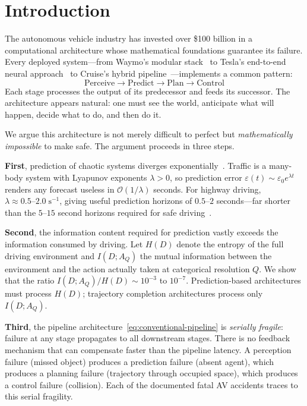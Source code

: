 \documentclass[twocolumn,10pt]{article}
\theoremstyle{definition}
\newcommand{\BigO}{\mathcal{O}}
\begin{document}
\section{Introduction}
\label{sec:introduction}

The autonomous vehicle industry has invested over \$100 billion in a computational architecture whose mathematical foundations guarantee its failure. Every deployed system---from Waymo's modular stack~\cite{urmson2008,levinson2011} to Tesla's end-to-end neural approach~\cite{bojarski2016,chen2024} to Cruise's hybrid pipeline~\cite{bansal2019}---implements a common pattern:
\begin{equation}
\text{Perceive} \to \text{Predict} \to \text{Plan} \to \text{Control}
\label{eq:conventional-pipeline}
\end{equation}
Each stage processes the output of its predecessor and feeds its successor. The architecture appears natural: one must see the world, anticipate what will happen, decide what to do, and then do it.

We argue this architecture is not merely difficult to perfect but \emph{mathematically impossible} to make safe. The argument proceeds in three steps.

\textbf{First}, prediction of chaotic systems diverges exponentially~\cite{poincare1890}. Traffic is a many-body system with Lyapunov exponents $\lambda > 0$, so prediction error $\varepsilon(t) \sim \varepsilon_0 e^{\lambda t}$ renders any forecast useless in $\BigO(1/\lambda)$ seconds. For highway driving, $\lambda \approx 0.5\text{--}2.0\;\text{s}^{-1}$, giving useful prediction horizons of $0.5$--$2$ seconds---far shorter than the $5$--$15$ second horizons required for safe driving~\cite{schwarting2018}.

\textbf{Second}, the information content required for prediction vastly exceeds the information consumed by driving. Let $H(D)$ denote the entropy of the full driving environment and $I(D; A_Q)$ the mutual information between the environment and the action actually taken at categorical resolution $Q$. We show that the ratio $I(D; A_Q)/H(D) \sim 10^{-3}$ to $10^{-7}$. Prediction-based architectures must process $H(D)$; trajectory completion architectures process only $I(D; A_Q)$.

\textbf{Third}, the pipeline architecture~\eqref{eq:conventional-pipeline} is \emph{serially fragile}: failure at any stage propagates to all downstream stages. There is no feedback mechanism that can compensate faster than the pipeline latency. A perception failure (missed object) produces a prediction failure (absent agent), which produces a planning failure (trajectory through occupied space), which produces a control failure (collision). Each of the documented fatal AV accidents traces to this serial fragility.
\end{document}
